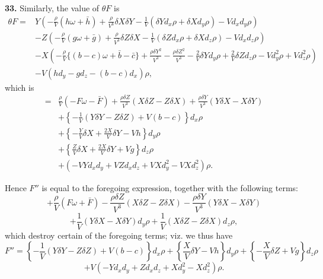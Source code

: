 \documentclass[11pt,a4paper]{article}
\newcommand{\Dx}{d_x}
\newcommand{\Dy}{d_y}
\newcommand{\Dz}{d_z}
\begin{document}
\textbf{33.} Similarly, the value of \(\theta F\) is
\[
\begin{aligned}
\theta F={}&Y\left(-\frac{\rho}{V}(h\omega+\bar h)+\frac{\rho}{V^3}\delta X\delta Y
-\frac1V(\delta Y\Dx\rho+\delta X\Dy\rho)-V\Dx\Dy\rho\right)\\
&-Z\left(-\frac{\rho}{V}(g\omega+\bar g)+\frac{\rho}{V^3}\delta Z\delta X
-\frac1V(\delta Z\Dx\rho+\delta X\Dz\rho)-V\Dx\Dz\rho\right)\\
&-X\left(-\frac{\rho}{V}\{(b-c)\omega+\bar b-\bar c\}
+\frac{\rho\delta Y^2}{V^3}-\frac{\rho\delta Z^2}{V^3}
-\frac2V\delta Y\Dy\rho+\frac2V\delta Z\Dz\rho
-V\Dy^2\rho+V\Dz^2\rho\right)\\
&-V(h\Dy-g\Dz-(b-c)\Dx)\rho,
\end{aligned}
\]
which is
\[
\begin{aligned}
={}&\frac{\rho}{V}(-F\omega-\bar F)
+\frac{\rho\delta Z}{V^3}(X\delta Z-Z\delta X)
+\frac{\rho\delta Y}{V^3}(Y\delta X-X\delta Y)\\
&+\left\{-\frac1V(Y\delta Y-Z\delta Z)+V(b-c)\right\}\Dx\rho\\
&+\left\{-\frac YV\delta X+\frac{2X}{V}\delta Y-Vh\right\}\Dy\rho\\
&+\left\{\frac ZV\delta X+\frac{2X}{V}\delta Y+Vg\right\}\Dz\rho\\
&+(-VY\Dx\Dy+VZ\Dx\Dz+VX\Dy^2-VX\Dz^2)\rho .
\end{aligned}
\]

\newpage
Hence \(F''\) is equal to the foregoing expression, together with the following terms:
\[
+\frac{\rho}{V}(F\omega+\bar F)
-\frac{\rho\delta Z}{V^3}(X\delta Z-Z\delta X)
-\frac{\rho\delta Y}{V^3}(Y\delta X-X\delta Y)
\]
\[
+\frac1V(Y\delta X-X\delta Y)\Dy\rho
+\frac1V(X\delta Z-Z\delta X)\Dz\rho,
\]
which destroy certain of the foregoing terms; viz. we thus have
\[
F''=\left\{-\frac1V(Y\delta Y-Z\delta Z)+V(b-c)\right\}\Dx\rho
+\left\{\frac XV\delta Y-Vh\right\}\Dy\rho
+\left\{-\frac XV\delta Z+Vg\right\}\Dz\rho
\]
\[
+V(-Y\Dx\Dy+Z\Dx\Dz+X\Dy^2-X\Dz^2)\rho.
\]
\end{document}
